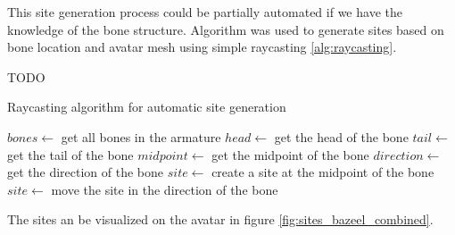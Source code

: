 \documentclass[../../main.tex]{subfiles}
\begin{document}
This site generation process could be partially automated if we have the knowledge of the bone structure. Algorithm was used to generate sites based on bone location and avatar mesh using simple raycasting \ref{alg:raycasting}.

TODO
\begin{algorithm}
    \label{alg:raycasting}
    \caption{Raycasting algorithm for automatic site generation}
    \begin{algorithmic}
        \State $bones \gets$ get all bones in the armature
            \State $head \gets$ get the head of the bone
            \State $tail \gets$ get the tail of the bone
            \State $midpoint \gets$ get the midpoint of the bone
            \State $direction \gets$ get the direction of the bone
            \State $site \gets$ create a site at the midpoint of the bone
            \State $site \gets$ move the site in the direction of the bone
        \EndFor
    \end{algorithmic}
\end{algorithm}

The sites an be visualized on the avatar in figure \ref{fig:sites_bazeel_combined}.
\end{document}
